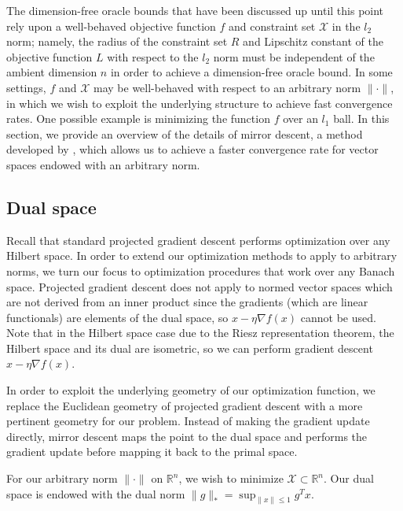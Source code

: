 

The dimension-free oracle bounds that have been discussed up until this point rely upon a well-behaved objective function $f$ and constraint set $\mathcal{X}$ in the $l_2$ norm; namely, the radius of the constraint set $R$ and Lipschitz constant of the objective function $L$ with respect to the $l_2$ norm must be independent of the ambient dimension $n$ in order to achieve a dimension-free oracle bound. In some settings, $f$ and $\mathcal{X}$ may be well-behaved with respect to an arbitrary norm $\|\cdot \|$, in which we wish to exploit the underlying structure to achieve fast convergence rates. One possible example is minimizing the function $f$ over an $l_1$ ball. In this section, we provide an overview of the details of mirror descent, a method developed by \citep{blair1985problem}, which allows us to achieve a faster convergence rate for vector spaces endowed with an arbitrary norm. 

\subsection{Dual space}
Recall that standard projected gradient descent performs optimization over any Hilbert space. In order to extend our optimization methods to apply to arbitrary norms, we turn our focus to optimization procedures that work over any Banach space. Projected gradient descent does not apply to normed vector spaces which are not derived from an inner product since the gradients (which are linear functionals) are elements of the dual space, so $x - \eta \nabla f(x)$ cannot be used. Note that in the Hilbert space case due to the Riesz representation theorem, the Hilbert space and its dual are isometric, so we can perform gradient descent $x - \eta \nabla f(x)$.

In order to exploit the underlying geometry of our optimization function, we replace the Euclidean geometry of projected gradient descent with a more pertinent geometry for our problem. Instead of making the gradient update directly, mirror descent maps the point to the dual space and performs the gradient update before mapping it back to the primal space.

For our arbitrary norm $\|\cdot \|$ on $\mathbb{R}^n$, we wish to minimize $\mathcal{X} \subset \mathbb{R}^n$. Our dual space is endowed with the dual norm $\|g \|_* = \sup_{\|x\|\leq 1} g^Tx$.

